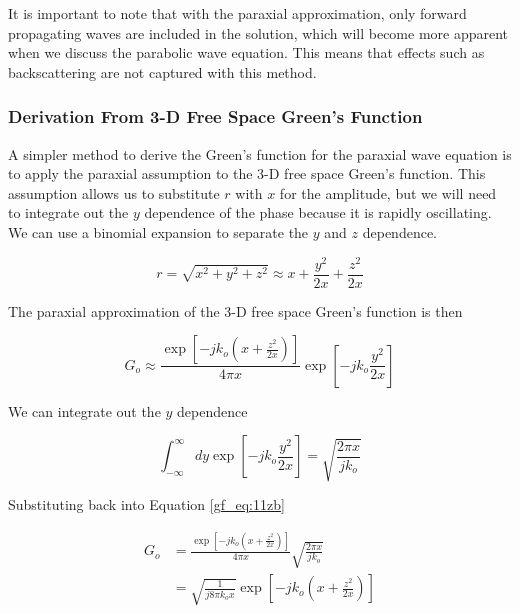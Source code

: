 It is important to note that with the paraxial approximation, only forward propagating waves are included in the solution, which will become more apparent when we discuss the parabolic wave equation. This means that effects such as backscattering are not captured with this method. 

\subsubsection{Derivation From 3-D Free Space Green's Function}
A simpler method to derive the Green's function for the paraxial wave equation is to apply the paraxial assumption to the 3-D free space Green's function. This assumption allows us to substitute $r$ with $x$ for the amplitude, but we will need to integrate out the $y$ dependence of the phase because it is rapidly oscillating. We can use a binomial expansion to separate the $y$ and $z$ dependence.

\begin{equation}
r = \sqrt{x^2+y^2+z^2} \approx x + \frac{y^2}{2x}+\frac{z^2}{2x}
\label{gf_eq:11za}
\end{equation}
 \renewcommand{\baselinestretch}{2} \small\normalsize
 
\noindent The paraxial approximation of the 3-D free space Green's function is then

\begin{equation}
G_o \approx \frac{\exp\left[-jk_o\left(x+\frac{z^2}{2x} \right)\right]}{4\pi x} \exp\left[-jk_o\frac{y^2}{2x}\right]
\label{gf_eq:11zb}
\end{equation}
 \renewcommand{\baselinestretch}{2} \small\normalsize
 
\noindent We can integrate out the $y$ dependence

\begin{equation}
\int_{-\infty}^{\infty} dy \exp\left[-jk_o\frac{y^2}{2x}\right] = \sqrt{\frac{2\pi x}{jk_o}}
\label{gf_eq:11zc}
\end{equation}
 \renewcommand{\baselinestretch}{2} \small\normalsize
 
\noindent Substituting back into Equation \ref{gf_eq:11zb}

\begin{equation}
\begin{aligned}
G_o &= \frac{\exp\left[-jk_o\left(x+\frac{z^2}{2x} \right)\right]}{4\pi x} \sqrt{\frac{2\pi x}{jk_o}}\\
&= \sqrt{\frac{1}{j8\pi k_o x}}\exp\left[-jk_o\left(x+\frac{z^2}{2x} \right)\right]
\label{gf_eq:11zd}
\end{aligned}
\end{equation}
 \renewcommand{\baselinestretch}{2} \small\normalsize
 
